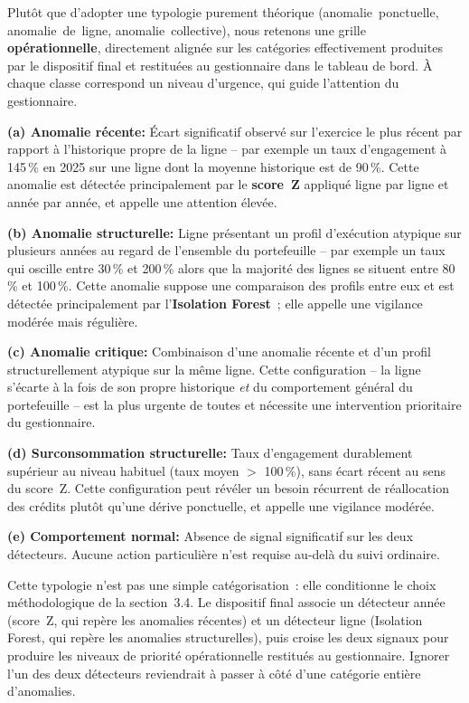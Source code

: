 Plut\^ot que d'adopter une typologie purement th\'eorique
(anomalie~ponctuelle, anomalie~de~ligne, anomalie~collective), nous retenons
une grille \textbf{op\'erationnelle}, directement align\'ee sur les
cat\'egories effectivement produites par le dispositif final et restitu\'ees
au gestionnaire dans le tableau de bord. \`A chaque classe correspond un
niveau d'urgence, qui guide l'attention du gestionnaire.

\textbf{(a) Anomalie r\'ecente:} \'Ecart significatif observ\'e sur l'exercice
le plus r\'ecent par rapport \`a l'historique propre de la ligne -- par
exemple un taux d'engagement \`a 145\,\% en 2025 sur une ligne dont la
moyenne historique est de 90\,\%. Cette anomalie est d\'etect\'ee
principalement par le \textbf{score~Z} appliqu\'e ligne par ligne et ann\'ee
par ann\'ee, et appelle une attention \'elev\'ee.

\textbf{(b) Anomalie structurelle:} Ligne pr\'esentant un profil
d'ex\'ecution atypique sur plusieurs ann\'ees au regard de l'ensemble du
portefeuille -- par exemple un taux qui oscille entre 30\,\% et 200\,\% alors
que la majorit\'e des lignes se situent entre 80\,\% et 100\,\%. Cette
anomalie suppose une comparaison des profils entre eux et est d\'etect\'ee
principalement par l'\textbf{Isolation Forest}~; elle appelle une vigilance
mod\'er\'ee mais r\'eguli\`ere.

\textbf{(c) Anomalie critique:} Combinaison d'une anomalie r\'ecente et
d'un profil structurellement atypique sur la m\^eme ligne. Cette
configuration -- la ligne s'\'ecarte \`a la fois de son propre historique
\emph{et} du comportement g\'en\'eral du portefeuille -- est la plus urgente
de toutes et n\'ecessite une intervention prioritaire du gestionnaire.

\textbf{(d) Surconsommation structurelle:} Taux d'engagement durablement
sup\'erieur au niveau habituel (taux moyen $>$ 100\,\%), sans \'ecart r\'ecent
au sens du score~Z. Cette configuration peut r\'ev\'eler un besoin r\'ecurrent
de r\'eallocation des cr\'edits plut\^ot qu'une d\'erive ponctuelle, et appelle
une vigilance mod\'er\'ee.

\textbf{(e) Comportement normal:} Absence de signal significatif sur les deux
d\'etecteurs. Aucune action particuli\`ere n'est requise au-del\`a du suivi
ordinaire.

Cette typologie n'est pas une simple cat\'egorisation~: elle conditionne le
choix m\'ethodologique de la section~3.4. Le dispositif final associe un
d\'etecteur \og ann\'ee \fg{} (score~Z, qui rep\`ere les anomalies r\'ecentes)
et un d\'etecteur \og ligne \fg{} (Isolation Forest, qui rep\`ere les
anomalies structurelles), puis croise les deux signaux pour produire les
niveaux de priorit\'e op\'erationnelle restitu\'es au gestionnaire. Ignorer
l'un des deux d\'etecteurs reviendrait \`a passer \`a c\^ot\'e d'une
cat\'egorie enti\`ere d'anomalies.

